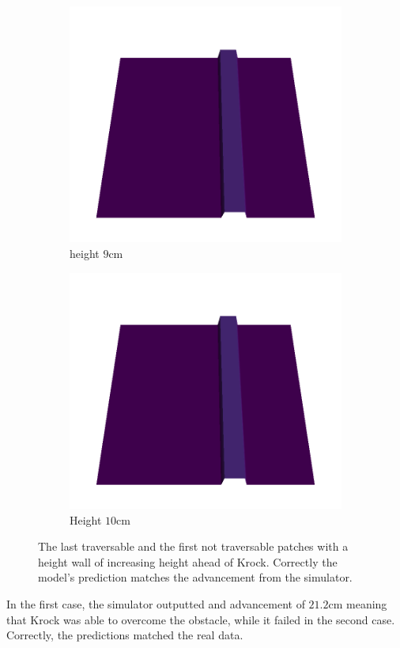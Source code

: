 \documentclass[../document.tex]{subfiles}
\begin{document}
\begin{figure} [htbp]
\begin{subfigure}[b]{0.33\textwidth}
    \end{subfigure}   
    \begin{subfigure}[b]{0.33\textwidth}
        \includegraphics[width=\linewidth]{../img/5/custom_patches/walls_increasing/1-3d.png}
    \caption{height $9$cm}
    \end{subfigure}   
    \begin{subfigure}[b]{0.33\textwidth}
        \includegraphics[width=\linewidth]{../img/5/custom_patches/walls_increasing/2-3d}
        \caption{Height $10$cm}
    \end{subfigure}   
\caption{The last traversable and the first not traversable patches with a  height wall of increasing height ahead of Krock. Correctly the model's prediction matches the advancement from the simulator.}    
    \label{fig : wall-height-sim}

\end{figure}
In the first case, the simulator outputted and advancement of $21.2$cm meaning that Krock was able to overcome the obstacle, while it failed in the second case. Correctly, the predictions matched the real data.
\end{document}
